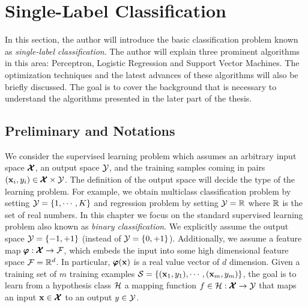 %
\section{Single-Label Classification}\label{sc_slc}

In this section, the author will introduce the basic classification problem known as \textit{single-label classification}.
The author will explain three prominent algorithms in this area: Perceptron, Logistic Regression and Support Vector Machines.
The optimization techniques and the latest advances of these algorithms will also be briefly discussed.
The goal is to cover the background that is necessary to understand the algorithms presented in the later part of the thesis. 

%
%
\subsection{Preliminary and Notations}\label{sc_slc_pn}
We consider the supervised learning problem which assumes an arbitrary input space $\pmb {\mathcal{X}}$, an output space $\mathcal{Y}$, and the training samples coming in pairs $(\mathbf {x}_i,y_i)\in\pmb {\mathcal{X}}\times\mathcal{Y}$.
The definition of the output space will decide the type of the learning problem.
For example, we obtain multiclass classification problem by setting $\mathcal{Y}=\{1,\cdots,K\}$ and regression problem by setting $\mathcal{Y}=\mathbb{R}$ where $\mathbb{R}$ is the set of real numbers.
In this chapter we focus on the standard supervised learning problem also known as \textit{binary classification}.
We explicitly assume the output space $\mathcal{Y}=\{-1,+1\}$ (instead of $\mathcal{Y}=\{0,+1\}$).
Additionally, we assume a feature map $\pmb \varphi:\pmb {\mathcal{X}}\rightarrow\mathcal{F}$, which embeds the input into some high dimensional feature space $\mathcal{F}=\mathbb{R}^d$.
In particular, $\pmb \varphi(\mathbf {x})$ is a real value vector of $d$ dimension.
Given a training set of $m$ training examples $\mathcal{S}=\{(\mathbf {x}_1,y_1),\cdots,(\mathbf {x}_m,y_m)\}$, the goal is to learn from a {hypothesis class} $\mathcal{H}$ a mapping function $f\in\mathcal{H}:\pmb {\mathcal{X}}\rightarrow\mathcal{Y}$ that maps an input $\mathbf {x}\in\pmb {\mathcal{X}}$ to an output $y\in\mathcal{Y}$. 

